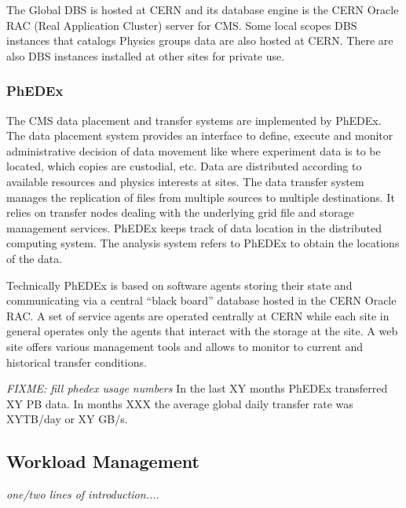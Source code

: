 The Global DBS is hosted at CERN and its database engine is the CERN Oracle RAC (Real Application Cluster) server for CMS. Some local scopes DBS instances that catalogs Physics groups data are also hosted at CERN. There are also DBS instances installed at other sites for private use. 

\subsubsection{PhEDEx}
\label{sec:3_1_2}
The CMS data placement and transfer systems are implemented by PhEDEx\cite{RefPhEDEx}. The data placement system provides an interface to define, execute and monitor administrative decision of data movement like where experiment data is to be located, which copies are custodial, etc. 
Data are distributed according to available resources and physics interests at sites. 
The data transfer system manages the replication of files from multiple sources to multiple destinations. It relies on transfer nodes dealing with %
the underlying grid file and storage management services.
PhEDEx keeps track of data location in the distributed computing system. The analysis system refers to PhEDEx to obtain the locations of the data.

Technically PhEDEx is based on software agents storing their state and communicating via a central “black board” database hosted in the CERN Oracle RAC. A set of service agents are operated centrally at CERN while each site in general operates only the agents that interact with the storage at the site. A web site offers various management tools and allows to monitor to current and historical transfer conditions.

\emph{FIXME: fill phedex usage numbers} In the last XY months PhEDEx transferred XY PB data. In months XXX the average global daily transfer rate was XYTB/day or XY GB/s. 

\subsection{Workload Management}
\emph{one/two lines of introduction....}
\label{sec:3_2}
